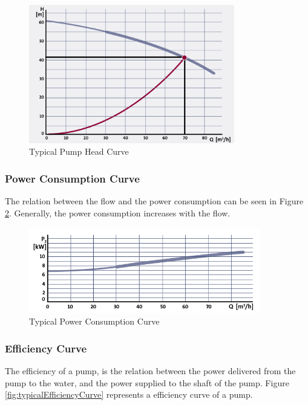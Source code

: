 \begin{figure}[h]
	\centering
	\includegraphics[width=0.8\textwidth]{figures/03physicalSetup/typicalHeadCurve.PNG}
	\caption{Typical Pump Head Curve}
	\label{fig:typicalPumpCurve}
\end{figure}

\subsubsection{Power Consumption Curve}
The relation between the flow and the power consumption can be seen in Figure \ref{fig:typicalPowerConsumptionCurve}.
Generally, the power consumption increases with the flow.

\begin{figure}[h]
	\centering
	\includegraphics[width=0.9\textwidth]{figures/03physicalSetup/typicalPowerConsumptionCurve.PNG}
	\caption{Typical Power Consumption Curve}
	\label{fig:typicalPowerConsumptionCurve}
\end{figure}

\subsubsection{Efficiency Curve}
The efficiency of a pump, is the relation between the power delivered from the pump to the water,
and the power supplied to the shaft of the pump. Figure \ref{fig:typicalEfficiencyCurve} represents 
a efficiency curve of a pump.

